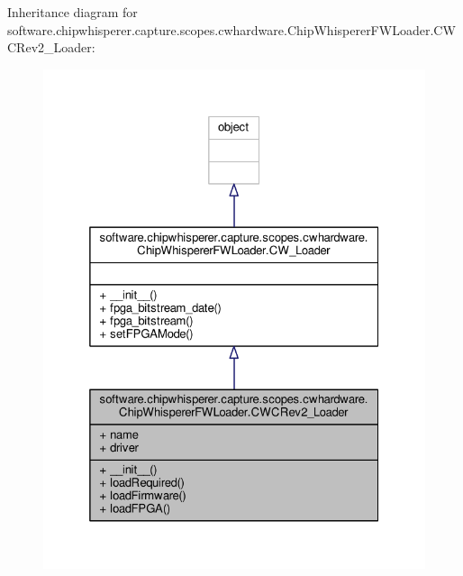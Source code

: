Inheritance diagram for software.\+chipwhisperer.\+capture.\+scopes.\+cwhardware.\+Chip\+Whisperer\+F\+W\+Loader.\+C\+W\+C\+Rev2\+\_\+\+Loader\+:\nopagebreak
\begin{figure}[H]
\begin{center}
\leavevmode
\includegraphics[width=325pt]{d6/d23/classsoftware_1_1chipwhisperer_1_1capture_1_1scopes_1_1cwhardware_1_1ChipWhispererFWLoader_1_1CWCRev2__Loader__inherit__graph}
\end{center}
\end{figure}



